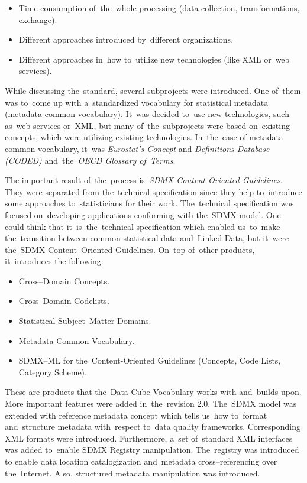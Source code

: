 \begin{itemize}
\item Time consumption of~the~whole processing (data collection, transformations, 
exchange).
\item Different approaches introduced by~different organizations.
\item Different approaches in~how to~utilize new technologies (like XML or~web 
services).
\end{itemize}

While discussing the~standard, several subprojects were introduced. One of~them was to~come
up with a~standardized vocabulary for statistical metadata (metadata common vocabulary). It~was
decided to~use new technologies, such as~web services or~XML, but many of~the~subprojects
were based on~existing concepts, which were utilizing existing technologies. In~the~case of
metadata common vocabulary, it~was \emph{Eurostat’s Concept} and
\emph{Definitions Database (CODED)} and~the~\emph{OECD Glossary of~Terms}.

The important result of~the~process is~\emph{SDMX Content-Oriented Guidelines}.
They were separated
from the~technical specification since they help to~introduce some approaches to~statisticians
for their work. The~technical specification was focused on~developing applications
conforming with the~SDMX model. One could think that it~is~the~technical specification
which enabled us~to~make the~transition between common statistical data and~Linked Data,
but it~were the~SDMX Content--Oriented Guidelines. On~top of~other products, it~introduces the
following:

\begin{itemize}
\item Cross--Domain Concepts.
\item Cross--Domain Codelists.
\item Statistical Subject--Matter Domains.
\item Metadata Common Vocabulary.
\item SDMX--ML for the~Content-Oriented Guidelines (Concepts, Code Lists, Category 
Scheme).
\end{itemize}

These are products that the~Data Cube Vocabulary works with and~builds upon. More important
features were added in~the~revision 2.0. The~SDMX model was extended with reference metadata
concept which tells us~how to~format and~structure metadata with~respect to~data quality
frameworks. Corresponding XML formats were introduced. Furthermore, a~set of~standard XML
interfaces was added to~enable SDMX Registry manipulation. The~registry was introduced to
enable data location catalogization and~metadata cross--referencing over the~Internet. Also,
structured metadata manipulation was introduced.

